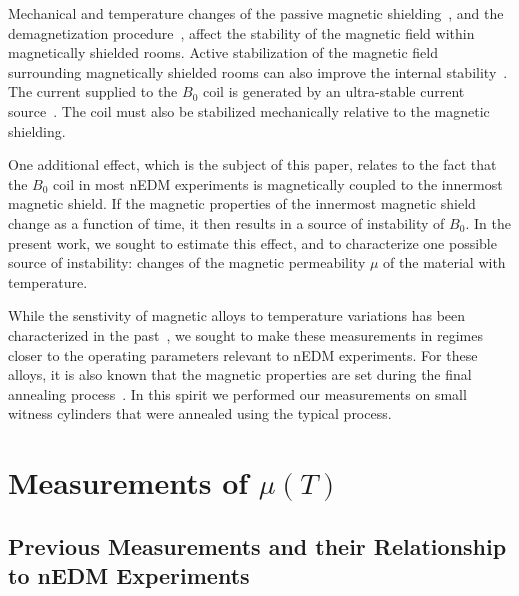 \documentclass[review]{elsarticle}
\begin{document}
Mechanical and temperature changes of the passive magnetic
shielding~\cite{bib:voigt,bib:thiel}, and the demagnetization
procedure~\cite{bib:thiel,bib:altarev2015,bib:fierlinger2016}, affect
the stability of the magnetic field within magnetically shielded
rooms.  Active stabilization of the magnetic field surrounding
magnetically shielded rooms can also improve the internal
stability~\cite{bib:voigt,bib:afach,bib:franke}.  The current supplied
to the $B_0$ coil is generated by an ultra-stable current
source~\cite{bib:brys}. The coil must also be stabilized mechanically
relative to the magnetic shielding.

One additional effect, which is the subject of this paper, relates to
the fact that the $B_0$ coil in most nEDM experiments is magnetically
coupled to the innermost magnetic shield.  If the magnetic properties
of the innermost magnetic shield change as a function of time, it then
results in a source of instability of $B_0$.  In the present work, we
sought to estimate this effect, and to characterize one possible
source of instability: changes of the magnetic permeability $\mu$ of
the material with temperature.

While the senstivity of magnetic alloys to temperature variations has
been characterized in the past~\cite{bib:couderchon,bib:kruppvdm}, we
sought to make these measurements in regimes closer to the operating
parameters relevant to nEDM experiments.  For these alloys, it is also
known that the magnetic properties are set during the final annealing
process~\cite{bib:gupta,bib:bozorth,bib:kruppvdm}.  In this spirit we
performed our measurements on small witness cylinders that were
annealed using the typical process.








\section{Measurements of $\mu(T)$\label{sec:tdep}}

\subsection{Previous Measurements and their Relationship to nEDM Experiments\label{sec:previousmeasurement}}
\end{document}
